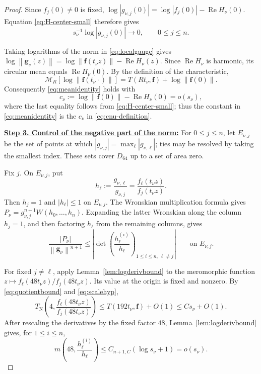 \documentclass[12pt,letterpaper,reqno]{amsart}
\theoremstyle{definition}
\numberwithin{equation}{section}
\newcommand{\TN}{T_{\mathrm N}}
\newcommand{\mean}[2]{\mathcal M_{#1}\!\left[#2\right]}
\newcommand{\norm}[1]{\left\lVert#1\right\rVert}
\DeclareMathOperator{\Ree}{Re}
\newcommand{\fv}{\bm f}
\newcommand{\gv}{\bm g}
\begin{document}
\begin{proof}
Since \(f_j(0)\ne0\) is fixed,
\(\log|g_{\nu,j}(0)|
 =\log|f_j(0)|-\Ree H_\nu(0)\).
Equation \eqref{eq:H-center-small} therefore gives
\begin{equation}\label{eq:center-component-normalization}
 s_\nu^{-1}\log|g_{\nu,j}(0)|
 \longrightarrow0,
 \qquad
 0\leq j\leq n.
\end{equation}

Taking logarithms of the norm in \eqref{eq:localgauge} gives
\(\log\norm{\gv_\nu(z)}
 =\log\norm{\fv(t_\nu z)}-\Ree H_\nu(z)\).
Since \(\Ree H_\nu\) is harmonic, its circular mean equals
\(\Ree H_\nu(0)\). By the definition of the characteristic,
\[
 \mean R{\log\norm{\fv(t_\nu\cdot)}}
 =
 T(Rt_\nu,\fv)+\log\norm{\fv(0)}.
\]
Consequently \eqref{eq:meanidentity} holds with
\begin{equation}\label{eq:cnu-definition}
 c_\nu
 :=
 \log\norm{\fv(0)}-\Ree H_\nu(0)
 =
 o(s_\nu),
\end{equation}
where the last equality follows from \eqref{eq:H-center-small}; thus
the constant in \eqref{eq:meanidentity} is the \(c_\nu\) in
\eqref{eq:cnu-definition}.


\medskip\noindent
\textbf{\underline{Step 3. Control of the negative part of the norm:}}
For \(0\leq j\leq n\), let \(E_{\nu,j}\) be the set of points at
which
\(|g_{\nu,j}|=\max_\ell|g_{\nu,\ell}|\); ties may be resolved by taking
the smallest index. These sets cover \(D_{64}\) up to a set of area
zero.

Fix \(j\). On \(E_{\nu,j}\), put
\[
 h_\ell
 :=
 \frac{g_{\nu,\ell}}{g_{\nu,j}}
 =
 \frac{f_\ell(t_\nu z)}{f_j(t_\nu z)}.
\]
Then \(h_j=1\) and \(|h_\ell|\leq1\) on \(E_{\nu,j}\).
The Wronskian multiplication formula gives
\(P_\nu=g_{\nu,j}^{n+1}W(h_0,\ldots,h_{n})\).
Expanding the latter Wronskian along the column \(h_j=1\), and then
factoring \(h_\ell\) from the remaining columns, gives
\begin{equation}\label{eq:negativedeterminant}
 \frac{|P_\nu|}{\norm{\gv_\nu}^{n+1}}
 \leq
 \left|
 \det\left(
 \frac{h_\ell^{(i)}}{h_\ell}
 \right)_{
 1\leq i\leq n,\ \ell\ne j}
 \right|
 \qquad\text{on }E_{\nu,j}.
\end{equation}

For fixed \(j\ne\ell\), apply
Lemma~\ref{lem:logderivbound} to the meromorphic function
\(z\mapsto f_\ell(48t_\nu z)/f_j(48t_\nu z)\).
Its value at the origin is fixed and nonzero. By
\eqref{eq:quotientbound} and \eqref{eq:scalehyp},
\[
 \TN\left(
 4,
 \frac{f_\ell(48t_\nu z)}{f_j(48t_\nu z)}
 \right)
 \leq
 T(192t_\nu,\fv)+O(1)
 \leq
 Cs_\nu+O(1).
\]
After rescaling the derivatives by the fixed factor \(48\),
Lemma~\ref{lem:logderivbound} gives, for
\(1\leq i\leq n\),
\begin{equation}\label{eq:ratio-logderiv-48}
 m\left(
 48,\frac{h_\ell^{(i)}}{h_\ell}
 \right)
 \leq
 C_{n+1,C}(\log s_\nu+1)
 =
 o(s_\nu).
\end{equation}


\end{proof}
\end{document}
